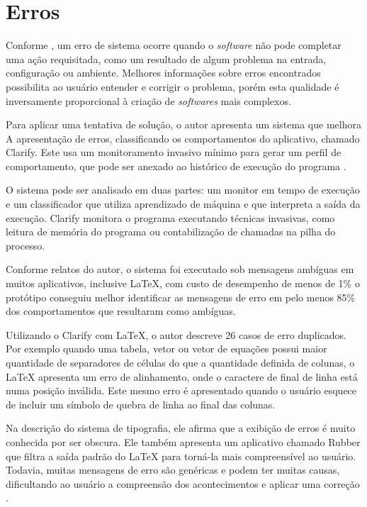 \documentclass{article}
\begin{document}
\section{Erros}
\label{sec:erros}

Conforme \cite{ha2007}, um erro de sistema ocorre quando o \textit{software} não
pode completar uma ação requisitada, como um resultado de algum problema na
entrada, configuração ou ambiente. Melhores informações sobre erros encontrados
possibilita ao usuário entender e corrigir o problema, porém esta qualidade é
inversamente proporcional à criação de \textit{softwares} mais complexos.

Para aplicar uma tentativa de solução, o autor apresenta um sistema que melhora
A apresentação de erros, classificando os comportamentos do aplicativo, chamado
Clarify. Este usa um monitoramento invasivo mínimo para gerar um perfil de
comportamento, que pode ser anexado ao histórico de execução do programa
\cite{ha2007}.

O sistema pode ser analisado em duas partes: um monitor em tempo de execução e
um classificador que utiliza aprendizado de máquina e que interpreta a saída da
execução. Clarify monitora o programa executando técnicas invasivas, como
leitura de memória do programa ou contabilização de chamadas na pilha do
processo.

Conforme relatos do autor, o sistema foi executado sob mensagens ambíguas em
muitos aplicativos, inclusive \LaTeX{}, com custo de desempenho de menos de 1\%
o protótipo conseguiu melhor identificar as mensagens de erro em pelo menos 85\%
dos comportamentos que resultaram como ambíguas.

Utilizando o Clarify com \LaTeX{}, o autor descreve 26 casos de erro duplicados.
Por exemplo quando uma tabela, vetor ou vetor de equações possui maior
quantidade de separadores de células do que a quantidade definida de colunas, o
\LaTeX{} apresenta um erro de alinhamento, onde o caractere de final de linha
está numa posição inválida. Este mesmo erro é apresentado quando o usuário
esquece de incluir um símbolo de quebra de linha ao final das colunas.

Na descrição do sistema de tipografia, ele afirma que a exibição de erros é
muito conhecida por ser obscura. Ele também apresenta um aplicativo chamado
Rubber que filtra a saída padrão do \LaTeX{} para torná-la mais compreensível ao
usuário. Todavia, muitas mensagens de erro são genéricas e podem ter muitas
causas, dificultando ao usuário a compreensão dos acontecimentos e aplicar uma
correção \cite{ha2007}.
\end{document}

